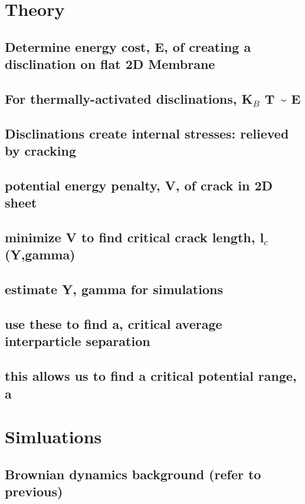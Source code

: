 \documentclass{umthesis}
\begin{document}
\section{Theory}
\label{sec-2.2}
\subsection{Determine energy cost, E, of creating a disclination on flat 2D Membrane}
\label{sec-2.2.1}
\subsection{For thermally-activated disclinations, K$_B$ T \~{} E}
\label{sec-2.2.2}
\subsection{Disclinations create internal stresses: relieved by cracking}
\label{sec-2.2.3}
\subsection{potential energy penalty, V, of crack in 2D sheet}
\label{sec-2.2.4}
\subsection{minimize V to find critical crack length, l$_c$(Y,gamma)}
\label{sec-2.2.5}
\subsection{estimate Y, gamma for simulations}
\label{sec-2.2.6}
\subsection{use these to find a, critical average interparticle separation}
\label{sec-2.2.7}
\subsection{this allows us to find a critical potential range, a}
\label{sec-2.2.8}
\section{Simluations}
\label{sec-2.3}
\subsection{Brownian dynamics background (refer to previous)}
\label{sec-2.3.1}
\end{document}
